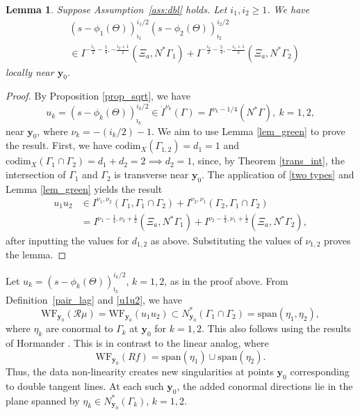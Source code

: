\documentclass[11pt]{article}
\newcommand{\be}{\begin{equation}}
\newcommand{\ee}{\end{equation}}
\newcommand{\WF}{\mathrm{WF}}
\numberwithin{equation}{section}
\newcommand{\vy}{\mathbf{y}}
\newtheorem{lemma}[theorem]{Lemma}
\theoremstyle{definition}
\begin{document}
\begin{lemma}
\label{lemma_prod} Suppose Assumption~\ref{ass:dbl} holds. Let $i_1,i_2 \geq 1$. We have
\be
\begin{split}
&(s - \phi_1(\Theta))_{\imath_1}^{i_1/2}(s - \phi_2(\Theta))_{\imath_2}^{i_2/2}\\
 &\in I^{-\frac{i_1}{2} - \frac{5}{4},-\frac{i_2+1}{2}}(\Xi_a, N^*\Gamma_1) + I^{-\frac{i_2}{2} - \frac{5}{4},-\frac{i_1+1}{2}}(\Xi_a, N^*\Gamma_2)
\end{split}
\ee
locally near $\vy_0$.
\end{lemma}
\begin{proof}
By Proposition \ref{prop_sqrt}, we have 
\be
u_k = (s - \phi_k(\Theta))_{\imath_k}^{i_k/2}\in \dot{I}^{\nu_k}(\Gamma)=I^{\nu_k-1/4}(N^*\Gamma),\ k=1,2,
\ee 
near $\vy_0$, where $\nu_k = -(i_k/2)-1$. We aim to use Lemma \ref{lem_green} to prove the result. First, we have $\text{codim}_X(\Gamma_{1,2}) = d_1 = 1$ and $\text{codim}_X(\Gamma_1 \cap\Gamma_2) = d_1 + d_2 = 2 \implies d_2 = 1$, since, by Theorem \ref{trans_int}, the intersection of $\Gamma_{1}$ and $\Gamma_2$ is transverse near $\vy_0$. The application of \eqref{two types} and Lemma \ref{lem_green} yields the result 
\be\label{u1u2}
\begin{split}
u_1u_2 &\in I^{\nu_1,\nu_2}(\Gamma_1,\Gamma_1\cap\Gamma_2) + I^{\nu_2,\nu_1}(\Gamma_2,\Gamma_1\cap\Gamma_2) \\
&=  I^{\nu_1 - \frac{1}{4},\nu_2+\frac{1}{2}}(\Xi_a, N^*\Gamma_1) + I^{\nu_2 - \frac{1}{4},\nu_1+\frac{1}{2}}(\Xi_a, N^*\Gamma_2),
\end{split}
\ee
after inputting the values for $d_{1,2}$ as above. Substituting the values of $\nu_{1,2}$ proves the lemma.
\end{proof}

Let $u_k = (s - \phi_k(\Theta))_{\imath_k}^{i_k/2}$, $k=1,2$, as in the proof above. From  Definition~\ref{pair_lag} and \eqref{u1u2}, we have
\be\label{wf nl}
\WF_{\vy_0}(\mathcal{R}\mu) = \WF_{\vy_0}(u_1u_2) \subset  N_{\vy_0}^*(\Gamma_1\cap\Gamma_2)=\text{span}(\eta_1,\eta_2),
\ee
where $\eta_k$ are conormal to $\Gamma_k$ at $\vy_0$ for $k = 1,2$. This also follows using the results of Hormander \cite[Theorem 8.2.10]{hor}. This is in contrast to the linear analog, where
\be\label{wf lin}
\WF_{\vy_0}(Rf) = \text{span}(\eta_1) \cup \text{span}(\eta_2).
\ee
Thus, the data non-linearity creates new singularities at points $\vy_0$ corresponding to double tangent lines. At each such $\vy_0$, the added conormal directions lie in the plane spanned by $\eta_k\in N_{\vy_0}^*(\Gamma_k)$, $k=1,2$. 
\end{document}
